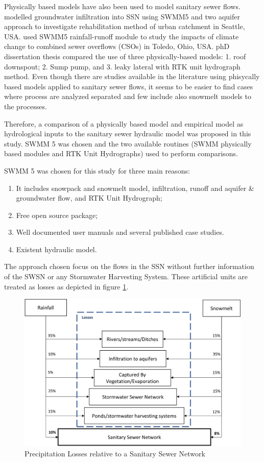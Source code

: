 Physically based models have also been used to model sanitary sewer flows. \citet{Robinson2015} modelled groundwater infiltration into \ac{SSN} using SWMM5 and two aquifer approach to investigate rehabilitation method of urban catchment in Seattle, USA. \cite{Apul2016} used SWMM5 rainfall-runoff module to study the impacts of climate change to combined sewer overflows (CSOs) in Toledo, Ohio, USA. \cite{choi2016} phD dissertation thesis compared the use of three physically-based models: 1. roof downspout; 2. Sump pump, and 3. leaky lateral with RTK unit hydrograph method. Even though there are studies available in the literature using phisycally based models applied to sanitary sewer flows, it seems to be easier to find cases where process are analyzed separated and few include also snowmelt models to the processes. 

Therefore, a comparison of a physically based model and empirical model as hydrological inputs to the sanitary sewer hydraulic model was proposed in this study. SWMM 5 was chosen and the two available routines (SWMM physically based modules and RTK Unit Hydrographs) used to perform comparisons. 

SWMM 5 was chosen for this study for three main reasons:
\begin{enumerate}
    \item It includes snowpack and snowmelt model, infiltration, runoff and aquifer \& groundwater flow, and RTK Unit Hydrograph;
    \item Free open source package;
    \item Well documented user manuals and several published case studies.
    \item Existent hydraulic model.
\end{enumerate}

The approach chosen focus on the flows in the \acf{SSN} without further information of the \acf{SWSN} or any Stormwater Harvesting System. These artificial units are treated as losses as depicted in figure \ref{fig:losses}.

\begin{figure}[ht]
    \centering
	\includegraphics[scale=0.4]{figures/losses.png}
	\caption{Precipitation Losses relative to a Sanitary Sewer Network}
	\label{fig:losses}
\end{figure}




